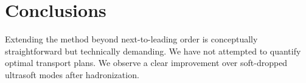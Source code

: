 \section{Conclusions}\label{sec:conclusions}

Extending the method beyond next-to-leading order is conceptually
straightforward but technically demanding. We have not attempted to
quantify optimal transport plans. We observe a clear improvement over
soft-dropped ultrasoft modes after hadronization.

